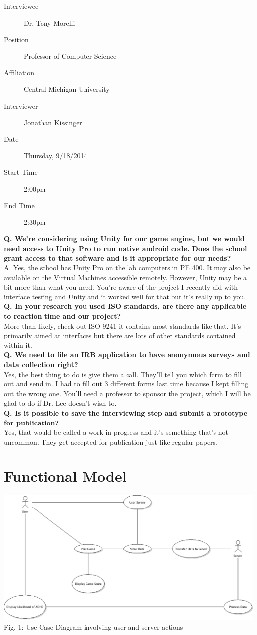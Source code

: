 \documentclass[a4wide]{article}
\begin{document}
\begin{description}
\item[Interviewee] Dr. Tony Morelli
\item[Position] Professor of Computer Science
\item[Affiliation] Central Michigan University
\item[Interviewer] Jonathan Kissinger
\item[Date] Thursday, 9/18/2014
\item[Start Time] 2:00pm
\item[End Time] 2:30pm
\end{description}
\textbf{Q. We're considering using Unity for our game engine, but we would need
access to Unity Pro to run native android code.  Does the school grant access to
that software and is it appropriate for our needs?}\\
A. Yes, the school has Unity Pro on the lab computers in PE 400.  It may also be
available on the Virtual Machines accessible remotely.  However, Unity may be a
bit more than what you need.  You're aware of the project I recently did with
interface testing and Unity and it worked well for that but it's really up to
you.\vspace{2.0 mm}\\
\textbf{Q. In your research you used ISO standards, are there any applicable to
reaction time and our project?}\\
More than likely, check out ISO 9241 it contains most standards like that.  It's
primarily aimed at interfaces but there are lots of other standards contained
within it.\vspace{2.0 mm}\\
\textbf{Q. We need to file an IRB application to have anonymous surveys and data
collection right?}\\
Yes, the best thing to do is give them a call.  They'll tell you which form to
fill out and send in.  I had to fill out 3 different forms last time because I
kept filling out the wrong one.  You'll need a professor to sponsor the project,
which I will be glad to do if Dr. Lee doesn't wish to.\vspace{2.0 mm}\\
\textbf{Q. Is it possible to save the interviewing step and submit a prototype
for publication?}\\
Yes, that would be called a work in progress and it's something that's not
uncommon.  They get accepted for publication just like regular papers.

\section{Functional Model}
\includegraphics[width=\textwidth]{UseCaseDiagram.png}
\tiny Fig. 1: Use Case Diagram involving user and server actions
\end{document}
